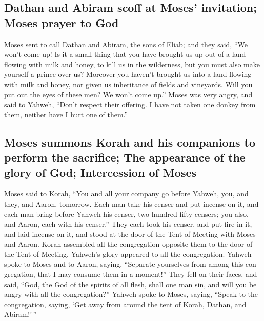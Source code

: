 \begin{paracol}{2}
\begin{otherlanguage}{english}
\hypertarget{dathan-and-abiram-scoff-at-moses-invitation-moses-prayer-to-god}{%
\subsection{Dathan and Abiram scoff at Moses' invitation; Moses prayer
to
God}\label{dathan-and-abiram-scoff-at-moses-invitation-moses-prayer-to-god}}

 Moses sent to call Dathan and Abiram, the sons of Eliab;
and they said, ``We won't come up!  Is it a small thing
that you have brought us up out of a land flowing with milk and honey,
to kill us in the wilderness, but you must also make yourself a prince
over us?  Moreover you haven't brought us into a land
flowing with milk and honey, nor given us inheritance of fields and
vineyards. Will you put out the eyes of these men? We won't come up.''
 Moses was very angry, and said to Yahweh, ``Don't
respect their offering. I have not taken one donkey from them, neither
have I hurt one of them.''

\hypertarget{moses-summons-korah-and-his-companions-to-perform-the-sacrifice-the-appearance-of-the-glory-of-god-intercession-of-moses}{%
\subsection{Moses summons Korah and his companions to perform the
sacrifice; The appearance of the glory of God; Intercession of
Moses}\label{moses-summons-korah-and-his-companions-to-perform-the-sacrifice-the-appearance-of-the-glory-of-god-intercession-of-moses}}

 Moses said to Korah, ``You and all your company go
before Yahweh, you, and they, and Aaron, tomorrow.  Each
man take his censer and put incense on it, and each man bring before
Yahweh his censer, two hundred fifty censers; you also, and Aaron, each
with his censer.''  They each took his censer, and put
fire in it, and laid incense on it, and stood at the door of the Tent of
Meeting with Moses and Aaron.  Korah assembled all the
congregation opposite them to the door of the Tent of Meeting. Yahweh's
glory appeared to all the congregation.  Yahweh spoke to
Moses and to Aaron, saying,  ``Separate yourselves from
among this congregation, that I may consume them in a moment!''
 They fell on their faces, and said, ``God, the God of
the spirits of all flesh, shall one man sin, and will you be angry with
all the congregation?''  Yahweh spoke to Moses, saying,
 ``Speak to the congregation, saying, `Get away from
around the tent of Korah, Dathan, and Abiram!'\,''


\end{otherlanguage}
\end{paracol}
